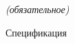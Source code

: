 \label{sec:appendix_d}

\begin{center}
	\normalfont\normalsize{\textit{(обязательное)}}

	\normalfont\normalsize{Спецификация}
\end{center}
\clearpage
